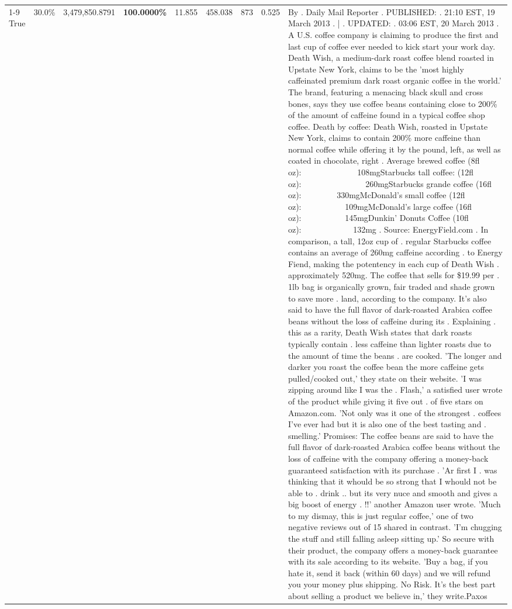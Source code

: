 \begin{table}[H]
{\begin{tabular}{lllrlllll}
\cline{1-9}
True & 30.0\% & 3,479,850.8791 & \bfseries \color{red} 100.0000\% & 11.855 & 458.038 & 873 & 0.525 & By . Daily Mail Reporter . PUBLISHED: . 21:10 EST, 19 March 2013 . | . UPDATED: . 03:06 EST, 20 March 2013 . A U.S. coffee company is claiming to produce the first and last cup of coffee ever needed to kick start your work day. Death Wish, a medium-dark roast coffee blend roasted in Upstate New York, claims to be the 'most highly caffeinated premium dark roast organic coffee in the world.' The brand, featuring a menacing black skull and cross bones, says they use coffee beans containing close to 200\% of the amount of caffeine found in a typical coffee shop coffee. Death by coffee: Death Wish, roasted in Upstate New York, claims to contain 200\% more caffeine than normal coffee while offering it by the pound, left, as well as coated in chocolate, right . Average brewed coffee (8fl oz):              108mgStarbucks tall coffee: (12fl oz):                260mgStarbucks grande coffee (16fl oz):         330mgMcDonald's small coffee (12fl oz):           109mgMcDonald's large coffee (16fl oz):           145mgDunkin' Donuts Coffee (10fl oz):             132mg . Source: EnergyField.com . In comparison, a tall, 12oz cup of . regular Starbucks coffee contains an average of 260mg caffeine according . to Energy Fiend, making the potentency in each cup of Death Wish . approximately 520mg. The coffee that sells for \$19.99 per . 1lb bag is organically grown, fair traded and shade grown to save more . land, according to the company. It's also said to have the full flavor of dark-roasted Arabica coffee beans without the loss of caffeine during its . Explaining . this as a rarity, Death Wish states that dark roasts typically contain . less caffeine than lighter roasts due to the amount of time the beans . are cooked. 'The longer and darker you roast the coffee bean the more caffeine gets pulled/cooked out,' they state on their website. 'I was zipping around like I was the . Flash,' a satisfied user wrote of the product while giving it five out . of five stars on Amazon.com. 'Not only was it one of the strongest . coffees I've ever had but it is also one of the best tasting and . smelling.’ Promises: The coffee beans are said to have the full flavor of dark-roasted Arabica coffee beans without the loss of caffeine with the company offering a money-back guaranteed satisfaction with its purchase . 'Ar first I . was thinking that it whould be so strong that I whould not be able to . drink .. but its very nuce and smooth and gives a big boost of energy . !!' another Amazon user wrote. 'Much to my dismay, this is just regular coffee,' one of two negative reviews out of 15 shared in contrast. 'I'm chugging the stuff and still falling asleep sitting up.' So secure with their product, the company offers a money-back guarantee with its sale according to its website. 'Buy a bag, if you hate it, send it back (within 60 days) and we will refund you your money plus shipping. No Risk. It’s the best part about selling a product we believe in,' they write.Paxos \\

\end{tabular}}
\end{table}
